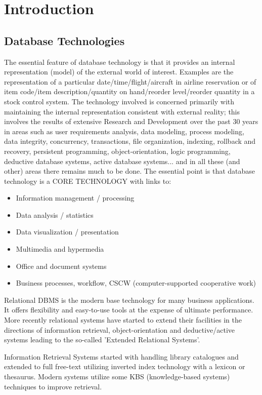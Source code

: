 \chapter{Introduction}

\section{Database Technologies}
The essential feature of database technology is that it provides an internal representation (model) of the external world of interest. Examples are the representation of a particular date/time/flight/aircraft in airline reservation or of item code/item description/quantity on hand/reorder level/reorder quantity in a stock control system. The technology involved is concerned primarily with maintaining the internal representation consistent with external reality; this involves the results of extensive Research and Development over the past 30 years in areas such as user requirements analysis, data modeling, process modeling, data integrity, concurrency, transactions, file organization, indexing, rollback and recovery, persistent programming, object-orientation, logic programming, deductive database systems, active database systems... and in all these (and other) areas there remains much to be done. The essential point is that database technology is a CORE TECHNOLOGY with links to:
\begin{itemize}
\item{Information management / processing}
\item{Data analysis / statistics}
\item{Data visualization / presentation}
\item{Multimedia and hypermedia}
\item{Office and document systems}
\item{Business processes, workflow, CSCW (computer-supported cooperative work)}
\end{itemize}
Relational DBMS is the modern base technology for many business applications. It offers flexibility and easy-to-use tools at the expense of ultimate performance. More recently relational systems have started to extend their facilities in the directions of information retrieval, object-orientation and deductive/active systems leading to the so-called 'Extended
Relational Systems'.

Information Retrieval Systems started with handling library catalogues and extended to full free-text utilizing inverted index technology with a lexicon or thesaurus. Modern systems utilize some KBS (knowledge-based systems) techniques to improve retrieval.

